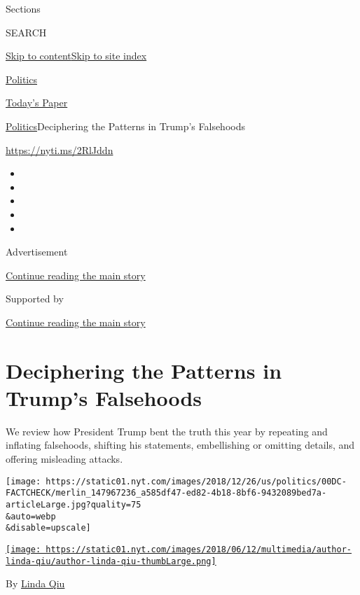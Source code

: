 Sections

SEARCH

\protect\hyperlink{site-content}{Skip to
content}\protect\hyperlink{site-index}{Skip to site index}

\href{https://www.nytimes.com/section/politics}{Politics}

\href{https://myaccount.nytimes.com/auth/login?response_type=cookie\&client_id=vi}{}

\href{https://www.nytimes.com/section/todayspaper}{Today's Paper}

\href{/section/politics}{Politics}\textbar{}Deciphering the Patterns in
Trump's Falsehoods

\url{https://nyti.ms/2RlJddn}

\begin{itemize}
\item
\item
\item
\item
\item
\end{itemize}

Advertisement

\protect\hyperlink{after-top}{Continue reading the main story}

Supported by

\protect\hyperlink{after-sponsor}{Continue reading the main story}

\hypertarget{deciphering-the-patterns-in-trumps-falsehoods}{%
\section{Deciphering the Patterns in Trump's
Falsehoods}\label{deciphering-the-patterns-in-trumps-falsehoods}}

We review how President Trump bent the truth this year by repeating and
inflating falsehoods, shifting his statements, embellishing or omitting
details, and offering misleading attacks.

\texttt{[image: https://static01.nyt.com/images/2018/12/26/us/politics/00DC-FACTCHECK/merlin\_147967236\_a585df47-ed82-4b18-8bf6-9432089bed7a-articleLarge.jpg?quality=75\\\&auto=webp\\\&disable=upscale]}

\href{https://www.nytimes.com/by/linda-qiu}{\texttt{[image: https://static01.nyt.com/images/2018/06/12/multimedia/author-linda-qiu/author-linda-qiu-thumbLarge.png]}}

By \href{https://www.nytimes.com/by/linda-qiu}{Linda Qiu}

